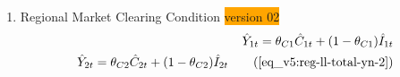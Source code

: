 \documentclass[../thesis.tex]{subfiles}
\begin{document}
{\begin{enumerate}
		\item Regional Market Clearing Condition \colorbox{orange}{version 02}
		\begin{align}
			\hat{Y}_{1t} = \theta_{C1} \hat{C}_{1t} + (1 - \theta_{C1}) \hat{I}_{1t} \nonumber \\
			\hat{Y}_{2t} = \theta_{C2} \hat{C}_{2t} + (1 - \theta_{C2}) \hat{I}_{2t} \tag{\ref{eq_v5:reg-ll-total-yn-2}}
		\end{align}
		
	\end{enumerate}
	
} %

\begin{comment}

\hrule

\subsubsection{Equations without $\eta$}

\begin{enumerate}
	
	\item Monetary Policy
	\begin{align}
		& \hat{R}_t = \gamma_R \hat{R}_{t-1} + (1-\gamma_R)(\gamma_\pi \hat{\pi}_t + \gamma_Y \hat{Y}_t) + \hat{Z}_{Mt}
	\end{align}
	
	\item National Gross Inflation Rate
	\begin{align}
		\hat{\pi}_{t} &= \hat{P}_{t} - \hat{P}_{t-1}
	\end{align}
	
	\item National Price Level
	\begin{alignat}{2}
		\hat{P}_{t} + \hat{Y}_{t} &= \theta_{PY1} (\hat{P}_{1t} + \hat{Y}_{1t}) + (1-\theta_{PY1}) (\hat{P}_{2t} + \hat{Y}_{2t})
	\end{alignat}
	
	\item Monetary Shock
	\begin{alignat}{2}
		\hat{Z}_{Mt} &= \rho_M \hat{Z}_{M,t-1} + \varepsilon_{M}
	\end{alignat}
	
	\item Market Clearing Condition
	\begin{align}
		\hat{Y}_{t} &= \theta_{Y1} \hat{Y}_{1t} + (1-\theta_{Y1}) \hat{Y}_{2t}
	\end{align}
	

\end{comment}
\end{document}

